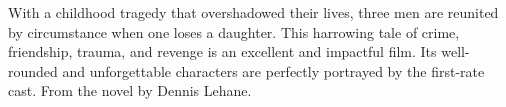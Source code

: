 \iffalse
\movie{Mulholland Dr.}{2001}{147m}{\four} \dir{David Lynch}
\fi

   With a childhood tragedy that overshadowed their lives, three men are reunited by circumstance when one loses a daughter. This harrowing tale of crime, friendship, trauma, and revenge is an excellent and impactful film. Its well-rounded and unforgettable characters are perfectly portrayed by the first-rate cast. From the novel by Dennis Lehane. \author{DW} 
